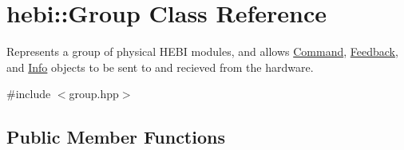 \hypertarget{classhebi_1_1Group}{}\section{hebi\+:\+:Group Class Reference}
\label{classhebi_1_1Group}


Represents a group of physical H\+E\+BI modules, and allows \hyperlink{classhebi_1_1Command}{Command}, \hyperlink{classhebi_1_1Feedback}{Feedback}, and \hyperlink{classhebi_1_1Info}{Info} objects to be sent to and recieved from the hardware.  




{\ttfamily \#include $<$group.\+hpp$>$}

\subsection*{Public Member Functions}
